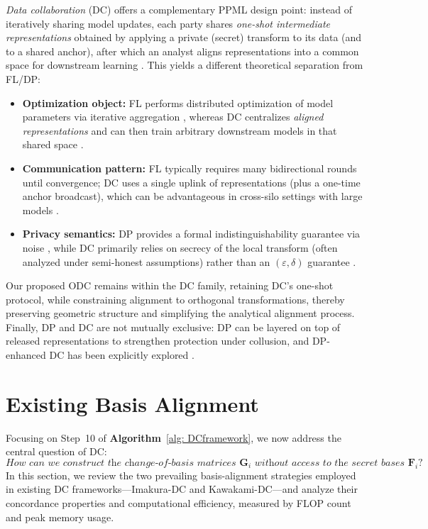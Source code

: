 \documentclass[final,3p,times]{elsarticle}
\theoremstyle{plain}
\newcommand{\matr}[1]{\bm{#1}}        %
\begin{document}
\emph{Data collaboration} (DC) offers a complementary PPML design point: instead of iteratively sharing model updates, each party shares \emph{one-shot intermediate representations} obtained by applying a private (secret) transform to its data (and to a shared anchor), after which an analyst aligns representations into a common space for downstream learning \cite{FL1, DC-DP}. This yields a different theoretical separation from FL/DP:
\begin{itemize}
  \item \textbf{Optimization object:} FL performs distributed optimization of model parameters via iterative aggregation \cite{FL1}, whereas DC centralizes \emph{aligned representations} and can then train arbitrary downstream models in that shared space \cite{DCframework1}.
  \item \textbf{Communication pattern:} FL typically requires many bidirectional rounds until convergence; DC uses a single uplink of representations (plus a one-time anchor broadcast), which can be advantageous in cross-silo settings with large models \cite{FL1, DCframework1}.
  \item \textbf{Privacy semantics:} DP provides a formal indistinguishability guarantee via noise \cite{DP}, while DC primarily relies on secrecy of the local transform (often analyzed under semi-honest assumptions) rather than an $(\varepsilon,\delta)$ guarantee \cite{DCprivacy}.
\end{itemize}

Our proposed ODC remains within the DC family, retaining DC's one-shot protocol, while constraining alignment to orthogonal transformations, thereby preserving geometric structure and simplifying the analytical alignment process. Finally, DP and DC are not mutually exclusive: DP can be layered on top of released representations to strengthen protection under collusion, and DP-enhanced DC has been explicitly explored \cite{DC-DP}.




\section{Existing Basis Alignment}
\label{section: Basis Alignment}

Focusing on Step~10 of \textbf{Algorithm}~\ref{alg: DCframework}, we now address the central question of DC:
\begin{equation}
\textit{How can we construct the change-of-basis matrices } \matr{G}_i \textit{ without access to the secret bases } \matr{F}_i \textit{?}
\end{equation}
In this section, we review the two prevailing basis-alignment strategies employed in existing DC frameworks—Imakura-DC and Kawakami-DC—and analyze their concordance properties and computational efficiency, measured by FLOP count and peak memory usage.
\end{document}
